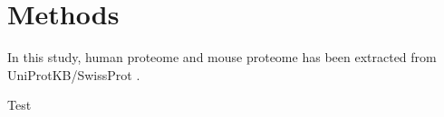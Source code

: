 \section{Methods}
In this study, human proteome and mouse proteome has been extracted from UniProtKB/SwissProt \cite{2007}. 

Test

